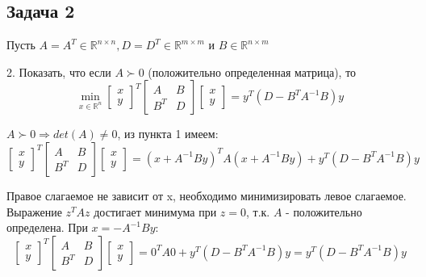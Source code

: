 \documentclass{article}
\begin{document}
    
    \subsection*{Задача 2}
    
    Пусть $ A = A^{T} \in \mathbb{R}^{n \times n}, D = D^T \in \mathbb{R}^{m \times m}$ и $ B \in \mathbb{R}^{n \times m}$
    \bigbreak
    
    2. Показать, что если $A \succ 0$ (положительно определенная матрица), то
    \begin{equation*}
         \min_{x \in \mathbb{R}^{n}} 
         \begin{bmatrix} x \\ y \end{bmatrix}^T
         \begin{bmatrix} A & B \\ B^T & D \end{bmatrix}
         \begin{bmatrix} x \\ y \end{bmatrix}
         = y^T(D-B^TA^{-1}B)y
    \end{equation*}
    
  
    $A \succ 0 \Rightarrow det(A) \neq 0$, из пункта 1 имеем:
    \begin{equation*}
         \begin{bmatrix} x \\ y \end{bmatrix}^T
         \begin{bmatrix} A & B \\ B^T & D \end{bmatrix}
         \begin{bmatrix} x \\ y \end{bmatrix}
         = (x + A^{-1}By)^{T}A(x + A^{-1}By) +
         y^T(D-B^TA^{-1}B)y
    \end{equation*}
    
    Правое слагаемое не зависит от x, необходимо минимизировать левое слагаемое.
    Выражение $z^{T}Az$ достигает минимума при $z = 0$, т.к. $A$ - положительно определена.
    При $x = -A^{-1}By$:
    \begin{equation*}
         \begin{bmatrix} x \\ y \end{bmatrix}^T
         \begin{bmatrix} A & B \\ B^T & D \end{bmatrix}
         \begin{bmatrix} x \\ y \end{bmatrix}
         = 0^{T}A0 + y^T(D-B^TA^{-1}B)y = y^T(D-B^TA^{-1}B)y
    \end{equation*}
\end{document}
